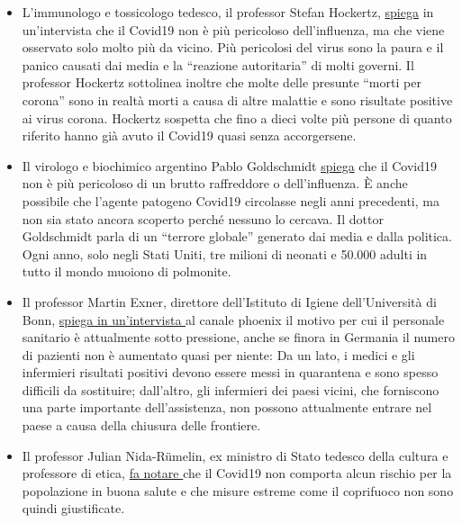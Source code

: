 \begin{itemize}
\tightlist
\item
  L'immunologo e tossicologo tedesco, il professor Stefan Hockertz,
  \href{https://www.youtube.com/watch?v=7wfb-B0BWmo}{spiega} in
  un'intervista che il Covid19 non è più pericoloso dell'influenza, ma
  che viene osservato solo molto più da vicino. Più pericolosi del virus
  sono la paura e il panico causati dai media e la ``reazione
  autoritaria'' di molti governi. Il professor Hockertz sottolinea
  inoltre che molte delle presunte ``morti per corona'' sono in realtà
  morti a causa di altre malattie e sono risultate positive ai virus
  corona. Hockertz sospetta che fino a dieci volte più persone di quanto
  riferito hanno già avuto il Covid19 quasi senza accorgersene.
\item
  Il virologo e biochimico argentino Pablo Goldschmidt
  \href{https://www.clarin.com/buena-vida/coronavirus-panico-injustificado-dice-virologo-argentino-francia_0_yVcmJ4RM.html}{spiega}
  che il Covid19 non è più pericoloso di un brutto raffreddore o
  dell'influenza. È anche possibile che l'agente patogeno Covid19
  circolasse negli anni precedenti, ma non sia stato ancora scoperto
  perché nessuno lo cercava. Il dottor Goldschmidt parla di un ``terrore
  globale'' generato dai media e dalla politica. Ogni anno, solo negli
  Stati Uniti, tre milioni di neonati e 50.000 adulti in tutto il mondo
  muoiono di polmonite.
\item
  Il professor Martin Exner, direttore dell'Istituto di Igiene
  dell'Università di Bonn,
  \href{https://www.youtube.com/watch?v=9mI9trSm3PY}{spiega in
  un'intervista }al canale phoenix il motivo per cui il personale
  sanitario è attualmente sotto pressione, anche se finora in Germania
  il numero di pazienti non è aumentato quasi per niente: Da un lato, i
  medici e gli infermieri risultati positivi devono essere messi in
  quarantena e sono spesso difficili da sostituire; dall'altro, gli
  infermieri dei paesi vicini, che forniscono una parte importante
  dell'assistenza, non possono attualmente entrare nel paese a causa
  della chiusura delle frontiere.
\item
  Il professor Julian Nida-Rümelin, ex ministro di Stato tedesco della
  cultura e professore di etica,
  \href{https://www.zdf.de/nachrichten/zdf-morgenmagazin/julian-nida-ruemelin-zur-corona-krise-100.html}{fa
  notare }che il Covid19 non comporta alcun rischio per la popolazione
  in buona salute e che misure estreme come il coprifuoco non sono
  quindi giustificate.

\end{itemize}
